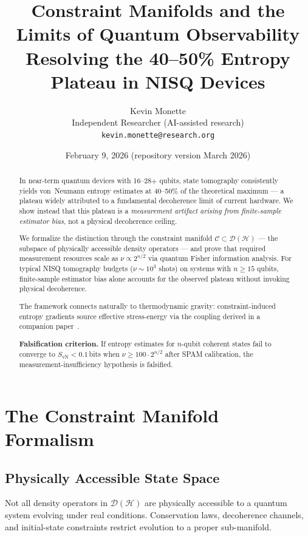 \documentclass[12pt,letterpaper]{article}
\title{\textbf{Constraint Manifolds and the Limits of Quantum Observability}\\[4pt]
\large Resolving the 40--50\% Entropy Plateau in NISQ Devices}
\author{Kevin Monette\\[2pt]
\small Independent Researcher (AI-assisted research)\\
\small \texttt{kevin.monette@research.org}}
\date{February 9, 2026 \quad (repository version March 2026)}
\theoremstyle{plain}
\theoremstyle{definition}
\newcommand{\Dens}{\mathcal{D}(\mathcal{H})}
\newcommand{\Cman}{\mathcal{C}}
\newcommand{\SvN}{S_{\mathrm{vN}}}
\begin{document}
\maketitle

\begin{abstract}
In near-term quantum devices with 16--28$+$ qubits, state tomography consistently yields
von~Neumann entropy estimates at 40--50\% of the theoretical maximum --- a plateau widely
attributed to a fundamental decoherence limit of current hardware.  We show instead that
this plateau is a \emph{measurement artifact arising from finite-sample estimator bias}, not a
physical decoherence ceiling.

We formalize the distinction through the constraint manifold
$\Cman \subset \Dens$ --- the subspace of physically accessible density operators --- and
prove that required measurement resources scale as $\nu \propto 2^{n/2}$ via quantum Fisher
information analysis.  For typical NISQ tomography budgets ($\nu \sim 10^{3}$ shots) on
systems with $n \geq 15$ qubits, finite-sample estimator bias alone accounts for the observed
plateau without invoking physical decoherence.

The framework connects naturally to thermodynamic gravity: constraint-induced entropy
gradients source effective stress-energy via the coupling derived in a companion
paper~\cite{MonetteA2026}.

\medskip\noindent
\textbf{Falsification criterion.} If entropy estimates for $n$-qubit coherent states fail to
converge to $\SvN < 0.1$\,bits when $\nu \geq 100 \cdot 2^{n/2}$ after SPAM calibration, the
measurement-insufficiency hypothesis is falsified.
\end{abstract}

\tableofcontents
\bigskip

\section{The Constraint Manifold Formalism}
\label{sec:manifold}

\subsection{Physically Accessible State Space}

Not all density operators in $\Dens$ are physically accessible to a quantum system evolving
under real conditions.  Conservation laws, decoherence channels, and initial-state constraints
restrict evolution to a proper sub-manifold.
\end{document}
